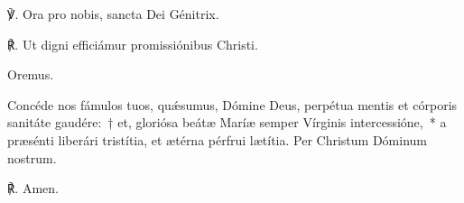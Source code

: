\noindent ℣. Ora pro nobis, sancta Dei Génitrix.

\noindent ℟. Ut digni efficiámur promissiónibus Christi.

%
%

Oremus.

\noindent  Concéde nos fámulos tuos, quǽsumus, Dómine Deus, perpétua mentis et córporis sanitáte gaudére:~†  et, gloriósa beátæ Maríæ semper Vírginis intercessióne,~* a præsénti liberári tristítia, et ætérna pérfrui lætítia. Per Christum Dóminum nostrum.

℟. Amen.